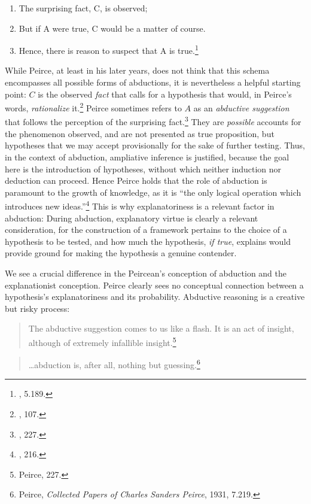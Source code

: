 \begin{enumerate}
\def\labelenumi{\arabic{enumi}.}
\tightlist
\item
  The surprising fact, C, is observed;
\item
  But if A were true, C would be a matter of course.
\item
  Hence, there is reason to suspect that A is true.\footnote{\cite{CP},
    5.189.}
\end{enumerate}

While Peirce, at least in his later years, does not think that this schema encompasses all possible forms of abductions, it is nevertheless a helpful starting point: \(C\) is the observed \emph{fact} that calls for a
hypothesis that would, in Peirce's words, \emph{rationalize}
it.\footnote{\cite{essentialpeirce2}, 107.}
Peirce sometimes refers to \(A\) as an \emph{abductive suggestion} that
follows the perception of the surprising fact.\footnote{\cite{essentialpeirce2}, 227.}
They are \emph{possible} accounts for the phenomenon observed, and are
not presented as true proposition, but hypotheses that we may accept
provisionally for the sake of further testing. Thus, in the context of
abduction, ampliative inference is justified, because the goal here is
the introduction of hypotheses, without which neither induction nor
deduction can proceed. Hence Peirce holds that the role of abduction is
paramount to the growth of knowledge, as it is ``the only logical
operation which introduces new ideas.''\footnote{\cite{essentialpeirce2}, 216.} This is
why explanatoriness is a relevant factor in abduction: During abduction,
explanatory virtue is clearly a relevant consideration, for the
construction of a framework pertains to the choice of a hypothesis to be
tested, and how much the hypothesis, \emph{if true}, explains would
provide ground for making the hypothesis a genuine contender.

We see a crucial difference in the Peircean's conception of abduction
and the explanationist conception. Peirce clearly sees no conceptual
connection between a hypothesis's explanatoriness and its probability.
Abductive reasoning is a creative but risky process:

\begin{quote}
The abductive suggestion comes to us like a flash. It is an act of
insight, although of extremely infallible insight.\footnote{Peirce, 227.}
\end{quote}

\begin{quote}
\ldots{}abduction is, after all, nothing but guessing.\footnote{Peirce,
  \emph{Collected Papers of Charles Sanders Peirce}, 1931, 7.219.}
\end{quote}

